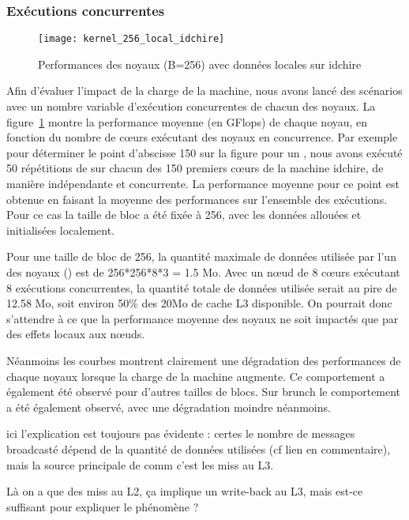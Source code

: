 \subsubsection{Exécutions concurrentes}

\begin{figure}[ht]
  \centering
  \texttt{[image: kernel\_256\_local\_idchire]}
  \caption{Performances des noyaux (B=256) avec données locales sur idchire}\label{fig:contribs:apps:cholesky:perf-256-local}
\end{figure}

Afin d'évaluer l'impact de la charge de la machine, nous avons lancé des scénarios avec un nombre variable d'exécution concurrentes de chacun des noyaux. La figure~\ref{fig:contribs:apps:cholesky:perf-256-local} montre la performance moyenne (en GFlops) de chaque noyau, en fonction du nombre de cœurs exécutant des noyaux en concurrence.
Par exemple pour déterminer le point d'abscisse 150 sur la figure pour un \gemm, nous avons exécuté 50 répétitions de \gemm sur chacun des 150 premiers cœurs de la machine idchire, de manière indépendante et concurrente.
La performance moyenne pour ce point est obtenue en faisant la moyenne des performances sur l'ensemble des exécutions.
Pour ce cas la taille de bloc a été fixée à 256, avec les données allouées et initialisées localement.

Pour une taille de bloc de 256, la quantité maximale de données utilisée par l'un des noyaux (\gemm) est de 256*256*8*3 = 1.5 Mo. Avec un nœud de 8 cœurs exécutant 8 exécutions concurrentes, la quantité totale de données utilisée serait au pire de 12.58 Mo, soit environ 50\% des 20Mo de cache L3 disponible.
On pourrait donc s'attendre à ce que la performance moyenne des noyaux ne soit impactés que par des effets locaux aux nœuds.

Néanmoins les courbes montrent clairement une dégradation des performances de chaque noyaux lorsque la charge de la machine augmente.
Ce comportement a également été observé pour d'autres tailles de blocs. Sur brunch le comportement a été également observé, avec une dégradation moindre néanmoins.

\begin{todo}
  ici l'explication est toujours pas évidente : certes le nombre de messages broadcasté dépend de la quantité de données utilisées (cf lien en commentaire), mais la source principale de comm c'est les miss au L3.
  
  Là on a que des miss au L2, ça implique un write-back au L3, mais est-ce suffisant pour expliquer le phénomène ?
\end{todo}

